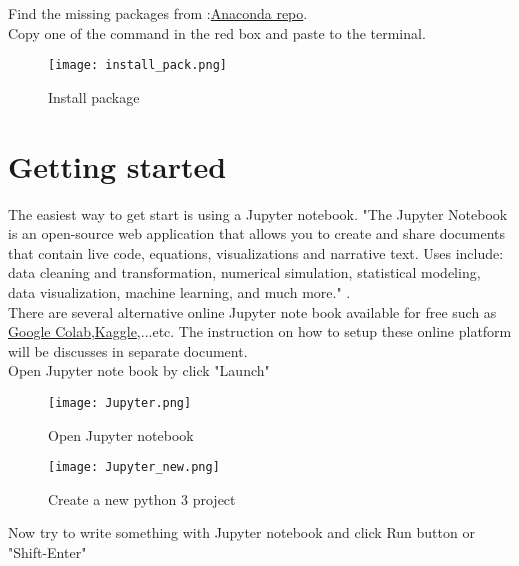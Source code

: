 \documentclass[a4paper,10pt]{article}
\begin{document}
Find the missing packages from :\href{https://anaconda.org/conda-forge/repo}{Anaconda repo}.\\ 
Copy one of the command in the red box and paste to the terminal.

\begin{figure}[H]
\centering\texttt{[image: install\_pack.png]}
\caption[Short title]{Install package}
\label{fig:ff6}\end{figure}



\medskip


\section{Getting started}
\label{sec:start}

The easiest way to get start is using a Jupyter notebook.
"The Jupyter Notebook is an open-source web application that allows you to create and share documents that contain live code, equations, visualizations and narrative text. Uses include: data cleaning and transformation, numerical simulation, statistical modeling, data visualization, machine learning, and much more." \cite{Jupyternotebook}.\\
There are several alternative online Jupyter note book available for free such as \href{https://colab.research.google.com/notebooks/welcome.ipynb}{Google Colab},\href{https://www.kaggle.com/}{Kaggle},...etc. The instruction on how to setup these online platform will be discusses in separate document.\\
Open Jupyter note book by click "Launch"

\begin{figure}[H]
\centering\texttt{[image: Jupyter.png]}
\caption[Short title]{Open Jupyter notebook}
\label{fig:ff7}\end{figure}

\begin{figure}[H]
\centering\texttt{[image: Jupyter\_new.png]}
\caption[Short title]{Create a new python 3 project}
\label{fig:ff8}\end{figure}

\vspace{1cm}

Now try to write something with Jupyter notebook and click Run button or "Shift-Enter"
\end{document}
